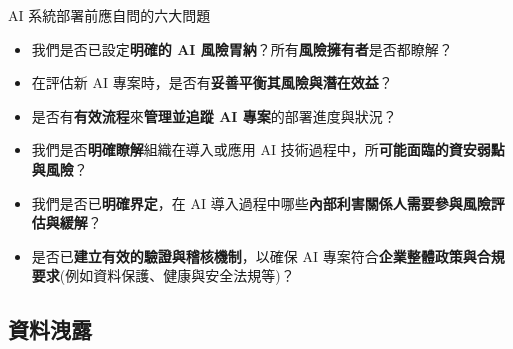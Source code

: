 \documentclass[aspectratio=1610]{Common/MyCourseBeamer}
\begin{document}
\begin{frame}[allowframebreaks]{AI 系統部署前應自問的六大問題}
	
	\begin{itemize}
		\item 我們是否已設定\textbf{明確的 AI 風險胃納}？所有\textbf{風險擁有者}是否都瞭解？
		\item 在評估新 AI 專案時，是否有\textbf{妥善平衡其風險與潛在效益}？
		\item 是否有\textbf{有效流程}來\textbf{管理並追蹤 AI 專案}的部署進度與狀況？
		\item 我們是否\textbf{明確瞭解}組織在導入或應用 AI 技術過程中，所\textbf{可能面臨的資安弱點與風險}？
		\item 我們是否已\textbf{明確界定}，在 AI 導入過程中哪些\textbf{內部利害關係人需要參與風險評估與緩解}？
		\item 是否已\textbf{建立有效的驗證與稽核機制}，以確保 AI 專案符合\textbf{企業整體政策與合規要求}(例如資料保護、健康與安全法規等)？
	\end{itemize}
	
\end{frame}

\subsection{資料洩露}
\end{document}
